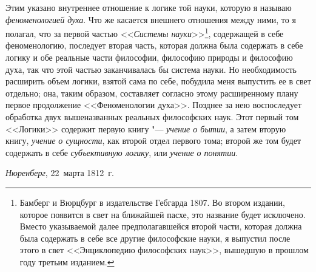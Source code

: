 Этим указано внутреннее отношение к логике той науки, которую я называю
{\em феноменологией духа}. Что же касается внешнего
отношения между ними, то я полагал, что за первой частью
<<{\em Системы науки}>>\footnote{Бамберг и Вюрцбург в
издательстве Гебгарда 1807. Во втором издании, которое появится в свет на
ближайшей пасхе, это название будет исключено. Вместо указываемой далее
предполагавшейся второй части, которая должна была содержать в себе все
другие философские науки, я выпустил после этого в свет <<Энциклопедию
философских наук>>, вышедшую в прошлом году третьим
изданием.},
содержащей в себе феноменологию, последует вторая часть, которая должна
была содержать в себе логику и обе реальные части философии, философию
природы и философию духа, так что этой частью заканчивалась бы система
науки. Но необходимость расширить объем логики, взятой сама по себе,
побудила меня выпустить ее в свет отдельно; она, таким образом, составляет
согласно этому расширенному плану первое продолжение <<Феноменологии духа>>.
Позднее за нею воспоследует обработка двух вышеназванных реальных
философских наук. Этот первый том <<Логики>> содержит первую книгу
"--- {\em учение о бытии}, а затем вторую книгу,
{\em учение о сущности}, как второй отдел первого тома;
второй же том будет содержать в себе {\em субъективную
логику}, или {\em учение о понятии}.

{\em Нюренберг}, 22~марта 1812~г.
\bigskip
